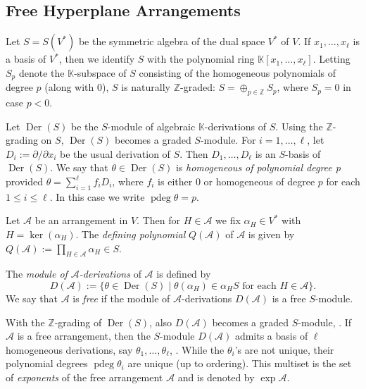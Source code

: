 \subsection{Free Hyperplane Arrangements}
Let $S = S(V^*)$ be the symmetric algebra of the dual space $V^*$ of $V$.
If $x_1, \ldots , x_\ell$ is a basis of $V^*$, then we identify $S$ with 
the polynomial ring ${{\mathbb K}}[x_1, \ldots , x_\ell]$.
Letting $S_p$ denote the ${{\mathbb K}}$-subspace of $S$
consisting of the homogeneous polynomials of degree $p$ (along with $0$),
$S$ is naturally ${{\mathbb Z}}$-graded: $S = \oplus_{p \in {{\mathbb Z}}}S_p$, where
$S_p = 0$ in case $p < 0$.

Let ${{\operatorname{Der}}}(S)$ be the $S$-module of algebraic ${{\mathbb K}}$-derivations of $S$.
Using the ${{\mathbb Z}}$-grading on $S$, ${{\operatorname{Der}}}(S)$ becomes a graded $S$-module.
For $i = 1, \ldots, \ell$, 
let $D_i := \partial/\partial x_i$ be the usual derivation of $S$.
Then $D_1, \ldots, D_\ell$ is an $S$-basis of ${{\operatorname{Der}}}(S)$.
We say that $\theta \in {{\operatorname{Der}}}(S)$ is 
\emph{homogeneous of polynomial degree p}
provided 
$\theta = \sum_{i=1}^\ell f_i D_i$, 
where $f_i$ is either $0$ or homogeneous of degree $p$
for each $1 \le i \le \ell$.
In this case we write ${\operatorname{pdeg}} \theta = p$.

Let ${{\mathcal A}}$ be an arrangement in $V$. 
Then for $H \in {{\mathcal A}}$ we fix $\alpha_H \in V^*$ with
$H = \ker(\alpha_H)$.
The \emph{defining polynomial} $Q({{\mathcal A}})$ of ${{\mathcal A}}$ is given by 
$Q({{\mathcal A}}) := \prod_{H \in {{\mathcal A}}} \alpha_H \in S$.

The \emph{module of ${{\mathcal A}}$-derivations} of ${{\mathcal A}}$ is 
defined by 
\[
D({{\mathcal A}}) := \{\theta \in {{\operatorname{Der}}}(S) \mid \theta(\alpha_H) \in \alpha_H S
\text{ for each } H \in {{\mathcal A}} \} .
\]
We say that ${{\mathcal A}}$ is \emph{free} if the module of ${{\mathcal A}}$-derivations
$D({{\mathcal A}})$ is a free $S$-module.

With the ${{\mathbb Z}}$-grading of ${{\operatorname{Der}}}(S)$, also $D({{\mathcal A}})$ 
becomes a graded $S$-module,
\cite[Prop.\ 4.10]{orlikterao:arrangements}.
If ${{\mathcal A}}$ is a free arrangement, then the $S$-module 
$D({{\mathcal A}})$ admits a basis of $\ell$ homogeneous derivations, 
say $\theta_1, \ldots, \theta_\ell$, \cite[Prop.\ 4.18]{orlikterao:arrangements}.
While the $\theta_i$'s are not unique, their polynomial 
degrees ${\operatorname{pdeg}} \theta_i$ 
are unique (up to ordering). This multiset is the set of 
\emph{exponents} of the free arrangement ${{\mathcal A}}$
and is denoted by $\exp {{\mathcal A}}$.

